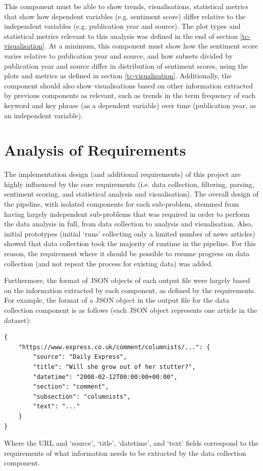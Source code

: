 \documentclass{report}
\begin{document}
This component must be able to show trends, visualisations, statistical metrics that show how dependent variables (e.g. sentiment score) differ relative to the independent variables (e.g. publication year and source).
The plot types and statistical metrics relevant to this analysis was defined in the end of section \ref{tc-visualisation}.
At a minimum, this component must show how the sentiment score varies relative to publication year and source, and how subsets divided by publication year and source differ in distribution of sentiment scores, using the plots and metrics as defined in section \ref{tc-visualisation}.
Additionally, the component should also show visualisations based on other information extracted by previous components as relevant, such as trends in the term frequency of each keyword and key phrase (as a dependent variable) over time (publication year, as an independent variable).


\section{Analysis of Requirements} \label{Analysis of Requirements}

The implementation design (and additional requirements) of this project are highly influenced by the core requirements (i.e. data collection, filtering, parsing, sentiment scoring, and statistical analysis and visualisation).
The overall design of the pipeline, with isolated components for each sub-problem, stemmed from having largely independent sub-problems that was required in order to perform the data analysis in full, from data collection to analysis and visualisation.
Also, initial prototypes (initial `runs' collecting only a limited number of news articles) showed that data collection took the majority of runtime in the pipeline.
For this reason, the requirement where it should be possible to resume progress on data collection (and not repeat the process for existing data) was added.

Furthermore, the format of JSON objects of each output file were largely based on the information extracted by each component, as defined by the requirements.
For example, the format of a JSON object in the output file for the data collection component is as follows (each JSON object represents one article in the dataset):
\begin{lstlisting}
{
	"https://www.express.co.uk/comment/columnists/...": {
		"source": "Daily Express",
		"title": "Will she grow out of her stutter?",
		"datetime": "2008-02-12T00:00:00+00:00",
		"section": "comment",
		"subsection": "columnists",
		"text": "..."
	}
}
\end{lstlisting}
Where the URL and `source', `title', `datetime', and `text' fields correspond to the requirements of what information needs to be extracted by the data collection component.
\end{document}
